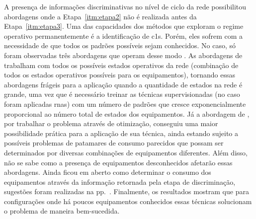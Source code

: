 A presença de informações discriminativas no nível de ciclo da rede
possibilitou abordagens onde a Etapa~\ref{itm:etapa2} não é realizada
antes da Etapa~\ref{itm:etapa3}. Uma das capacidades dos métodos que
exploram o regime operativo permanentemente é a identificação de
\glspl{c1}. Porém, eles sofrem com a necessidade de que todos os
padrões possíveis sejam conhecidos. No caso, só foram observadas três
abordagens que operam desse modo \cite{nilm_srinivasan_nn_2006_27,
nilm_itajuba_rodrigues,nilm_suzuki_2011_35}. As abordagens de
\cite{nilm_srinivasan_nn_2006_27,nilm_itajuba_rodrigues} trabalham com
todos os possíveis estados operativos da rede (combinação de todos os
estados operativos possíveis para os equipamentos), tornando essas
abordagens frágeis para a aplicação quando a quantidade de estados na
rede é grande, uma vez que é necessário treinar as técnicas
supervisionadas (no caso foram aplicadas \glspl{rna}) com um número de
padrões que cresce exponencialmente proporcional ao número total de
estados dos equipamentos. Já a abordagem de \cite{nilm_suzuki_2011_35},
por trabalhar o problema através de otimização, conseguiu uma maior
possibilidade prática para a aplicação de sua técnica, ainda estando
sujeito a possíveis problemas de patamares de consumo parecidos que
possam ser determinados por diversas combinações de equipamentos
diferentes. Além disso, não se sabe como a presença de equipamentos
desconhecidos afetarão essas abordagens. Ainda ficou em aberto como
determinar o consumo dos equipamentos através da informação retornada
pela etapa de discriminação, sugestões foram realizadas na
pp.~\pageref{text:transf_info_discr_energia}.  Finalmente, os
resultados mostram que para configurações onde há poucos equipamentos
conhecidos essas técnicas solucionam o problema de maneira bem-sucedida.

